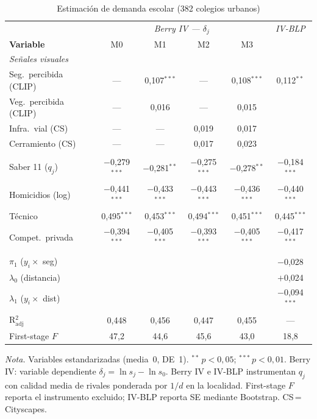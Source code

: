 \documentclass[12pt,a4paper]{article}
\begin{document}
\begin{table}[h!]
\centering
\caption{Estimación de demanda escolar (382 colegios urbanos)}
\label{tab:berry_blp}
\footnotesize
\begin{tabular}{lcccc|c}
\toprule
 & \multicolumn{4}{c|}{\textit{Berry IV --- $\delta_j$}} &
   \textit{IV-BLP} \\
\textbf{Variable} & M0 & M1 & M2 & M3 &  \\
\midrule
\multicolumn{6}{l}{\textit{Señales visuales}} \\
\quad Seg.\ percibida (CLIP) & --- &
  0{,}107$^{***}$ & --- & 0{,}108$^{***}$ &
  0{,}112$^{**}$ \\
\quad Veg.\ percibida (CLIP) & --- &
  0{,}016 & --- & 0{,}015 & \\
\quad Infra.\ vial (CS) & --- & --- &
  0{,}019 & 0{,}017 & \\
\quad Cerramiento (CS) & --- & --- &
  0{,}017 & 0{,}023 & \\
\addlinespace
\multicolumn{6}{l}{\textit{Calidad y controles}} \\
\quad Saber 11 ($q_j$) &
  $-$0{,}279$^{***}$ & $-$0{,}281$^{**}$ &
  $-$0{,}275$^{***}$ & $-$0{,}278$^{**}$ &
  $-$0{,}184$^{***}$ \\
\quad Homicidios (log) &
  $-$0{,}441$^{***}$ & $-$0{,}433$^{***}$ &
  $-$0{,}443$^{***}$ & $-$0{,}436$^{***}$ &
  $-$0{,}440$^{***}$ \\
\quad Técnico &
  0{,}495$^{***}$ & 0{,}453$^{***}$ &
  0{,}494$^{***}$ & 0{,}451$^{***}$ &
  0{,}445$^{***}$ \\
\quad Compet.\ privada &
  $-$0{,}394$^{***}$ & $-$0{,}405$^{***}$ &
  $-$0{,}393$^{***}$ & $-$0{,}405$^{***}$ &
  $-$0{,}417$^{***}$ \\
\addlinespace
\multicolumn{6}{l}{\textit{Parámetros heterogéneos (BLP)}} \\
\quad $\pi_1$ ($y_i \times$ seg) & & & & & $-$0{,}028 \\
\quad $\lambda_0$ (distancia) & & & & & $+$0{,}024 \\
\quad $\lambda_1$ ($y_i \times$ dist) & & & & & $-$0{,}094$^{***}$ \\
\midrule
R$^2_{\text{adj}}$ & 0{,}448 & 0{,}456 & 0{,}447 & 0{,}455 & --- \\
First-stage $F$ & 47{,}2 & 44{,}6 & 45{,}6 & 43{,}0 & 18{,}8 \\
\bottomrule
\end{tabular}
\begin{minipage}{\linewidth}
\vspace{4pt}\footnotesize
\textit{Nota.} Variables estandarizadas (media~0, DE~1).
$^{**}$\,$p<0{,}05$; $^{***}$\,$p<0{,}01$.
Berry IV: variable dependiente $\delta_j = \ln s_j - \ln s_0$.
Berry IV e IV-BLP instrumentan $q_j$ con calidad media de rivales ponderada por
$1/d$ en la localidad. First-stage $F$ reporta el instrumento excluido; IV-BLP
reporta SE mediante Bootstrap.
CS\,=\,Cityscapes.
\end{minipage}
\end{table}
\end{document}
